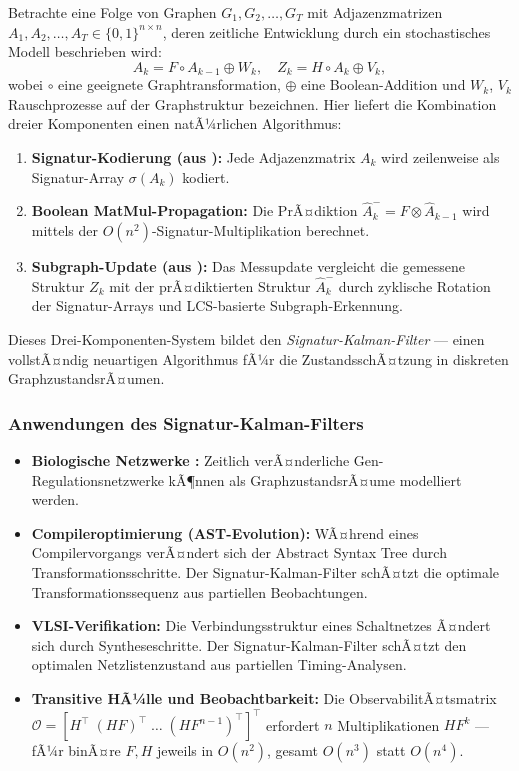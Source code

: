﻿\documentclass[a4paper,12pt]{article}
\theoremstyle{definition}
\begin{document}
Betrachte eine Folge von Graphen $G_1, G_2, \ldots, G_T$ mit Adjazenzmatrizen
$A_1, A_2, \ldots, A_T \in \{0,1\}^{n\times n}$, deren zeitliche Entwicklung
durch ein stochastisches Modell beschrieben wird:
\[
    A_k = F \circ A_{k-1} \oplus W_k, \quad Z_k = H \circ A_k \oplus V_k,
\]
wobei $\circ$ eine geeignete Graphtransformation, $\oplus$ eine Boolean-Addition
und $W_k$, $V_k$ Rauschprozesse auf der Graphstruktur bezeichnen. Hier liefert
die Kombination dreier Komponenten einen natÃ¼rlichen Algorithmus:
\begin{enumerate}
    \item \textbf{Signatur-Kodierung (aus \cite{epp2026boolmm}):} Jede Adjazenzmatrix
          $A_k$ wird zeilenweise als Signatur-Array $\sigma(A_k)$ kodiert.
    \item \textbf{Boolean MatMul-Propagation:} Die PrÃ¤diktion
          $\hat{A}_k^- = F \otimes \hat{A}_{k-1}$ wird mittels der
          $O(n^2)$-Signatur-Multiplikation berechnet.
    \item \textbf{Subgraph-Update (aus \cite{epp2026}):} Das Messupdate vergleicht
          die gemessene Struktur $Z_k$ mit der prÃ¤diktierten Struktur $\hat{A}_k^-$
          durch zyklische Rotation der Signatur-Arrays und LCS-basierte Subgraph-Erkennung.
\end{enumerate}
Dieses Drei-Komponenten-System bildet den \emph{Signatur-Kalman-Filter} --- einen
vollstÃ¤ndig neuartigen Algorithmus fÃ¼r die ZustandsschÃ¤tzung in diskreten
GraphzustandsrÃ¤umen.

\subsubsection{Anwendungen des Signatur-Kalman-Filters}

\begin{itemize}
    \item \textbf{Biologische Netzwerke \cite{epp2026bio}:} Zeitlich verÃ¤nderliche
          Gen-Regulationsnetzwerke kÃ¶nnen als GraphzustandsrÃ¤ume modelliert werden.
    \item \textbf{Compileroptimierung (AST-Evolution):} WÃ¤hrend eines Compilervorgangs
          verÃ¤ndert sich der Abstract Syntax Tree durch Transformationsschritte.
          Der Signatur-Kalman-Filter schÃ¤tzt die optimale Transformationssequenz
          aus partiellen Beobachtungen.
    \item \textbf{VLSI-Verifikation:} Die Verbindungsstruktur eines Schaltnetzes
          Ã¤ndert sich durch Syntheseschritte. Der Signatur-Kalman-Filter schÃ¤tzt
          den optimalen Netzlistenzustand aus partiellen Timing-Analysen.
    \item \textbf{Transitive HÃ¼lle und Beobachtbarkeit:} Die ObservabilitÃ¤tsmatrix
          $\mathcal{O} = [H^\top\; (HF)^\top\; \ldots\; (HF^{n-1})^\top]^\top$
          erfordert $n$ Multiplikationen $HF^k$ --- fÃ¼r binÃ¤re $F, H$ jeweils
          in $O(n^2)$, gesamt $O(n^3)$ statt $O(n^4)$.
\end{itemize}
\end{document}
